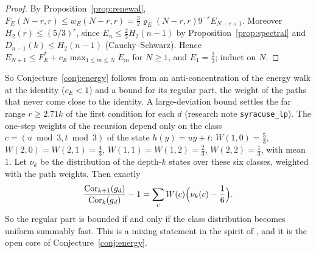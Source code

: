 \documentclass[12pt]{amsart}
\theoremstyle{definition}
\theoremstyle{remark}
\begin{document}
\begin{proof}
By Proposition~\ref{prop:renewal}, $F_E(N-r,r)\le w_E(N-r,r)=\frac32\varrho_E(N-r,r)9^{-r}E_{N-r+1}$. Moreover $H_2(r)\le(5/3)^r$, since $E_n\le\frac23H_2(n-1)$ by Proposition~\ref{prop:spectral} and $D_{n-1}(k)\le H_2(n-1)$ (Cauchy--Schwarz). Hence $E_{N+1}\le F^*_E+c_E\max_{1\le m\le N}E_m$ for $N\ge1$, and $E_1=\frac23$; induct on $N$.
\end{proof}

So Conjecture~\ref{conj:energy} follows from an anti-concentration of the energy walk at the identity ($c_E<1$) and a bound for its regular part, the weight of the paths that never come close to the identity. A large-deviation bound settles the far range $r\ge2.71k$ of the first condition for each $d$ (research note \texttt{syracuse\_lp}). The one-step weights of the recursion depend only on the class $c=(u\bmod3,t\bmod3)$ of the state $h(y)=uy+t$: $W(1,0)=\frac53$, $W(2,0)=W(2,1)=\frac43$, $W(1,1)=W(1,2)=\frac23$, $W(2,2)=\frac13$, with mean $1$. Let $\nu_k$ be the distribution of the depth-$k$ states over these six classes, weighted with the path weights. Then exactly
\[
 \frac{\operatorname{Cor}_{k+1}(g_d)}{\operatorname{Cor}_k(g_d)}-1=\sum_cW(c)\Bigl(\nu_k(c)-\frac16\Bigr).
\]
So the regular part is bounded if and only if the class distribution becomes uniform summably fast. This is a mixing statement in the spirit of \cite[Propositions~1.14, 1.17]{Tao_2022}, and it is the open core of Conjecture~\ref{conj:energy}.
\end{document}
